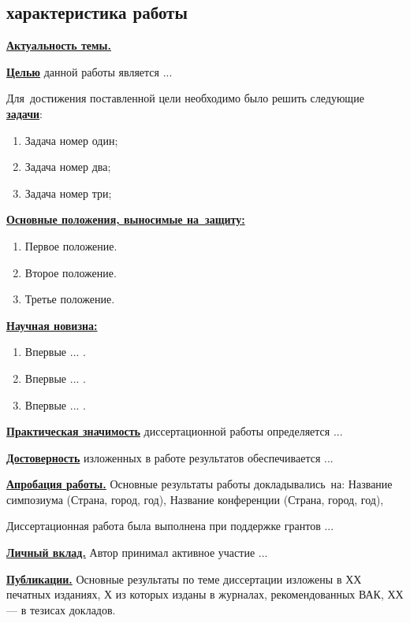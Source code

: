 \subsection*{ характеристика работы}
\fontsize{14pt}{15pt}\selectfont
\underline{\textbf{Актуальность темы.}}

\underline{\textbf{Целью}} данной работы является ...

Для~достижения поставленной цели необходимо было решить следующие \underline{\textbf{задачи}}:
\begin{enumerate}
 \item Задача номер один;
 \item Задача номер два;
 \item Задача номер три;
\end{enumerate}

\underline{\textbf{Основные положения, выносимые на~защиту:}}
\begin{enumerate}
 \item Первое положение.
 \item Второе положение.
 \item Третье положение.
\end{enumerate}

\underline{\textbf{Научная новизна:}}
\begin{enumerate}
 \item Впервые ... . 
 \item Впервые ... .
 \item Впервые ... . 
\end{enumerate}

\underline{\textbf{Практическая значимость}} диссертационной работы определяется ...

\underline{\textbf{Достоверность}} изложенных в работе результатов обеспечивается ...

\underline{\textbf{Апробация работы.}}
Основные результаты работы докладывались~на:
Название симпозиума (Страна, город, год),
Название конференции (Страна, город, год),

Диссертационная работа была выполнена при поддержке грантов ...

\underline{\textbf{Личный вклад.}} Автор принимал активное участие ...

\underline{\textbf{Публикации.}} Основные результаты по теме диссертации изложены в ХХ печатных изданиях, Х из которых изданы в журналах, рекомендованных ВАК, ХХ --- в тезисах докладов.

